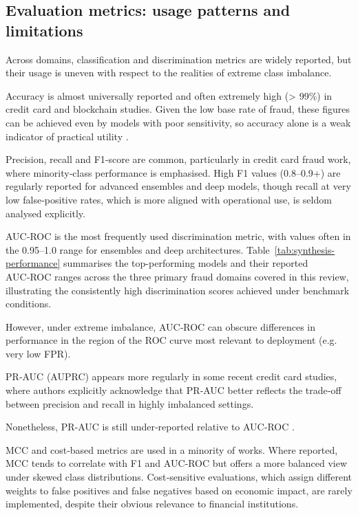 \documentclass[a4paper,fleqn]{cas-dc}
\begin{document}
\subsection{Evaluation metrics: usage patterns and limitations}

Across domains, classification and discrimination metrics are widely reported, but their usage is uneven with respect to the realities of extreme class imbalance.

Accuracy is almost universally reported and often extremely high (> 99\%) in credit card and blockchain studies. Given the low base rate of fraud, these figures can be achieved even by models with poor sensitivity, so accuracy alone is a weak indicator of practical utility \cite{plakandaras_credit_2022}.

Precision, recall and F1‑score are common, particularly in credit card fraud work, where minority‑class performance is emphasised. High F1 values (0.8–0.9+) are regularly reported for advanced ensembles and deep models, though recall at very low false‑positive rates, which is more aligned with operational use, is seldom analysed explicitly.

AUC‑ROC is the most frequently used discrimination metric, with values often in the 0.95–1.0 range for ensembles and deep architectures. Table~\ref{tab:synthesis-performance} summarises the top-performing models and their reported AUC‑ROC ranges across the three primary fraud domains covered in this review, illustrating the consistently high discrimination scores achieved under benchmark conditions. 

However, under extreme imbalance, AUC‑ROC can obscure differences in performance in the region of the ROC curve most relevant to deployment (e.g. very low FPR).

PR‑AUC (AUPRC) appears more regularly in some recent credit card studies, where authors explicitly acknowledge that PR‑AUC better reflects the trade‑off between precision and recall in highly imbalanced settings.

Nonetheless, PR‑AUC is still under‑reported relative to AUC‑ROC \cite{kennedy_synthesizing_2024}.

MCC and cost‑based metrics are used in a minority of works. Where reported, MCC tends to correlate with F1 and AUC‑ROC but offers a more balanced view under skewed class distributions. Cost‑sensitive evaluations, which assign different weights to false positives and false negatives based on economic impact, are rarely implemented, despite their obvious relevance to financial institutions.
\end{document}
